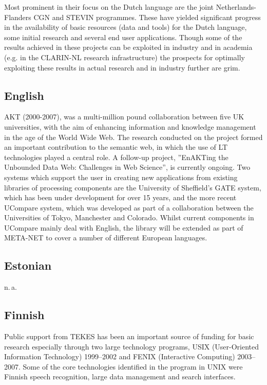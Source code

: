 \documentclass[10pt, plain]{../../metanetpaper}
\begin{document}
\begin{multicols}{2}
\begin{small}
Most prominent in their focus on the Dutch language are the joint Netherlands-Flanders CGN and STEVIN programmes. These have yielded significant progress in the availability of basic resources (data and tools) for the Dutch language, some initial research and several end user applications. Though some of the results achieved in these projects can be exploited in industry and in academia (e.g. in the CLARIN-NL research infrastructure) the prospects for optimally exploiting these results in actual research and in industry further are grim. 

\subsection*{English}
\label{sec:english}

AKT (2000-2007), was a multi-million pound collaboration between five UK universities, with the aim of enhancing information and knowledge management in the age of the World Wide Web. The research conducted on the project formed an important contribution to the semantic web, in which the use of LT technologies played a central role. A follow-up project, ”EnAKTing the Unbounded Data Web: Challenges in Web Science”, is currently ongoing.
Two systems which support the user in creating new applications from existing libraries of processing components are the University of Sheffield’s GATE system, which has been under development for over 15 years, and the more recent UCompare system, which was developed as part of a collaboration between the Universities of Tokyo, Manchester and Colorado. Whilst current components in UCompare mainly deal with English, the library will be extended as part of META-NET to cover a number of different European languages.

\subsection*{Estonian}
\label{sec:estonian}

n.\,a.

\subsection*{Finnish}
\label{sec:finnish}

Public support from TEKES has been an important source of funding for basic research especially through two large technology programs, USIX (User-Oriented Information Technology) 1999--2002 and FENIX (Interactive Computing) 2003--2007. Some of the core technologies identified in the program in UNIX were Finnish speech recognition, large data management and search interfaces.


\end{small}
\end{multicols}
\end{document}

